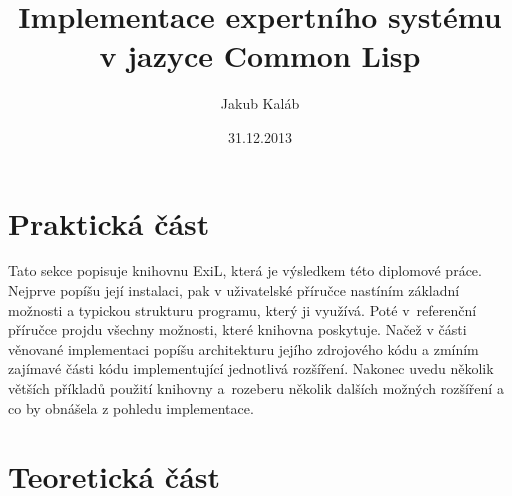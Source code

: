 \documentclass[12pt]{article}
\title{Implementace expertního systému v jazyce Common Lisp}
\author{Jakub Kaláb}
\date{31.12.2013}
\begin{document}
\maketitle
\renewcommand\listoflistingscaption{Seznam příkladů}
\renewcommand\listingscaption{Příklad}
\listoflistings
{}

\nocite{introduction}
\nocite{paradigms}
\nocite{doorenbos}
\nocite{practical}
\nocite{clips}
\nocite{clhs}
\nocite{expert-system}
\nocite{rete}

\clearpage


\clearpage
\section{Praktická část}
Tato sekce popisuje knihovnu ExiL\footnotemark, která je výsledkem této
diplomové práce. Nejprve popíšu její instalaci, pak v uživatelské příručce
nastíním základní možnosti a typickou strukturu programu, který ji využívá.
Poté v~referenční příručce projdu všechny možnosti, které knihovna poskytuje.
Načež v části věnované implementaci popíšu architekturu jejího zdrojového
kódu a zmíním zajímavé části kódu implementující jednotlivá rozšíření.
Nakonec uvedu několik větších příkladů použití knihovny a~rozeberu několik
dalších možných rozšíření a co by obnášela z pohledu implementace.



\clearpage

\clearpage

\clearpage


\clearpage
\section{Teoretická část}


\clearpage

% 

\end{document}
